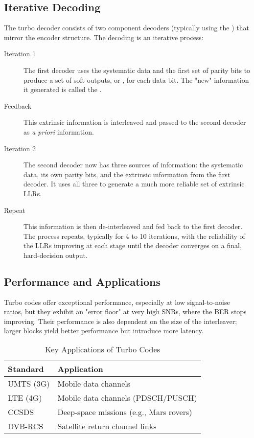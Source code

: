 \subsection{Iterative Decoding}

The turbo decoder consists of two component decoders (typically using the ) that mirror the encoder structure. The decoding is an iterative process:
\begin{description}
    \item[Iteration 1] The first decoder uses the systematic data and the first set of parity bits to produce a set of soft outputs, or , for each data bit. The "new" information it generated is called the .
    \item[Feedback] This extrinsic information is interleaved and passed to the second decoder as \emph{a priori} information.
    \item[Iteration 2] The second decoder now has three sources of information: the systematic data, its own parity bits, and the extrinsic information from the first decoder. It uses all three to generate a much more reliable set of extrinsic LLRs.
    \item[Repeat] This information is then de-interleaved and fed back to the first decoder. The process repeats, typically for 4 to 10 iterations, with the reliability of the LLRs improving at each stage until the decoder converges on a final, hard-decision output.
\end{description}


\subsection{Performance and Applications}

Turbo codes offer exceptional performance, especially at low signal-to-noise ratios, but they exhibit an "error floor" at very high SNRs, where the BER stops improving. Their performance is also dependent on the size of the interleaver; larger blocks yield better performance but introduce more latency.

\begin{table}[H]
    \centering
    \caption{Key Applications of Turbo Codes}
    \label{tab:turbo-applications}
    \begin{tabular}{@{}ll@{}}
        \toprule
        \tableheaderfont Standard & \tableheaderfont Application \\
        \midrule
        UMTS (3G) & Mobile data channels \\
        LTE (4G) & Mobile data channels (PDSCH/PUSCH) \\
        CCSDS & Deep-space missions (e.g., Mars rovers) \\
        DVB-RCS & Satellite return channel links \\
        \bottomrule
    \end{tabular}
\end{table}

